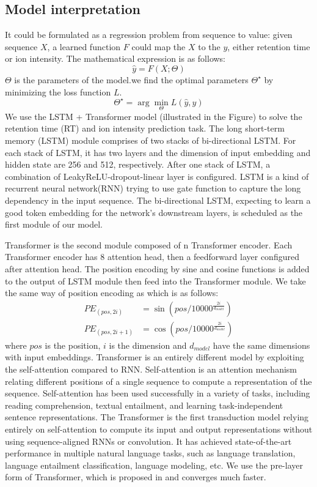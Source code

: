 
\subsection{Model interpretation}

It could be formulated as a regression problem from sequence to value: given sequence \( X \), a learned 
function \( F \) could map the \( X \) to the \( y \), either retention time or ion intensity. The mathematical expression is as follows: 
\[ \hat{y} = F(X;\Theta) \]
$\Theta$ is the parameters of the model.we find the optimal parameters \( \Theta^\star\) by minimizing  the loss function \( L \).
\[ \Theta^\star = \arg\min_{\Theta} L(\hat{y}, y) \]
We use the LSTM + Transformer model (illustrated in the Figure) to solve the retention time (RT) and ion intensity prediction task. 
The long short-term memory (LSTM)\cite{hochreiter1997long} module comprises of two stacks of bi-directional LSTM. For each stack of LSTM, it has two layers and the dimension of input embedding and hidden state are 256 and 512, respectively. After one stack of LSTM, a combination of LeakyReLU-dropout-linear layer is configured. LSTM is a kind of recurrent neural network(RNN) trying to use gate function to capture the long dependency in the input sequence. The bi-directional LSTM, expecting to learn a good token embedding for the network's downstream layers, is scheduled as the first module of our model. 

Transformer\cite{vaswani2017attention} is the second module composed of n Transformer encoder. 
Each Transformer encoder has 8 attention head, then a feedforward layer configured after attention head.
The position encoding by sine and cosine functions is added to the output of LSTM module then feed into the Transformer module.
We take the same way of position encoding as \cite{vaswani2017attention} which is as follows:
\begin{align*}
    PE_{(pos, 2i)} &= \sin{(pos/10000^{\frac{2i}{d_{model}}})} \\
    PE_{(pos, 2i+1)} &= \cos{(pos/10000^{\frac{2i}{d_{model}}})} 
\end{align*}
where $pos$  is the position, $i$ is the dimension and $d_{model}$ have the same dimensions with input embeddings.
Transformer is an entirely different model by exploiting the self-attention compared to RNN. 
Self-attention is an attention mechanism relating different positions of a single sequence to compute a representation of the sequence. Self-attention has been used successfully in a variety of tasks, including reading 
comprehension, textual entailment, and learning task-independent sentence representations.
The Transformer is the first transduction model relying entirely on self-attention to compute its input and output representations without using sequence-aligned RNNs or convolution. It has achieved state-of-the-art performance in multiple natural language tasks, such as language translation, language entailment classification, language modeling, etc. We use the pre-layer form of Transformer, which is proposed in \cite{xiong2020layer} and converges much faster.
